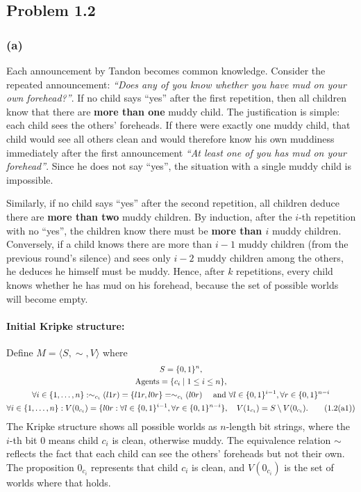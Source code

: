 \subsection*{Problem 1.2}

\subsubsection*{(a)}
Each announcement by Tandon becomes common knowledge. 
Consider the repeated announcement: 
\emph{``Does any of you know whether you have 
mud on your own forehead?''}. 
If no child says ``yes'' after the first repetition, 
then all children know that there are 
\textbf{more than one} muddy child. 
The justification is simple: each child sees the others' 
foreheads. 
If there were exactly one muddy child, that 
child would see all others clean and would therefore know 
his own muddiness immediately after the first announcement 
\emph{``At least one of you has mud on your forehead''}. 
Since he does not say ``yes'', the situation 
with a single muddy child is impossible.

Similarly, if no child says ``yes'' after the second 
repetition, all children deduce there are 
\textbf{more than two} muddy children. By induction, 
after the $i$-th repetition with no ``yes'', 
the children know there must be \textbf{more than $i$} 
muddy children. Conversely, if a child knows 
there are more than $i-1$ muddy children 
(from the previous round's silence) and sees only $i-2$ muddy 
children among the others, he deduces he himself must be muddy. 
Hence, after $k$ repetitions, 
every child knows whether he has mud on his forehead,
because the set of possible worlds will become empty.

\paragraph*{Initial Kripke structure:}
Define \( M = \langle S, \sim, V \rangle \) where
\begin{gather*}
    S = \{0,1\}^n, \\
    \text{Agents} = \{c_i \mid 1 \leq i \leq n\}, \\
    \forall i \in \{1,\dots,n\}: 
        \sim_{c_i}(l1r) = \{l1r, l0r\} = \sim_{c_i}(l0r)
        \quad \text{ and } \forall l \in \{0,1\}^{i-1}, \forall r \in \{0,1\}^{n-i}\\
    \forall i \in \{1,\dots,n\}: 
        V(0_{c_i}) = \{ l0r : \forall l \in \{0,1\}^{i-1}, \forall r \in \{0,1\}^{n-i} \},\quad 
        V(1_{c_i}) = S \setminus V(0_{c_i}).
        \tag{1.2(a1)}\label{eq:1.2(a1)}
\end{gather*}
The Kripke structure shows all possible worlds as 
$n$-length bit strings, where the $i$-th bit 0 means child 
$c_i$ is clean, otherwise muddy. The equivalence relation $\sim$ 
reflects the fact that each child can see the others' foreheads 
but not their own. The proposition $0_{c_i}$ represents that 
child $c_i$ is clean, and $V(0_{c_i})$ is the set of worlds 
where that holds.

